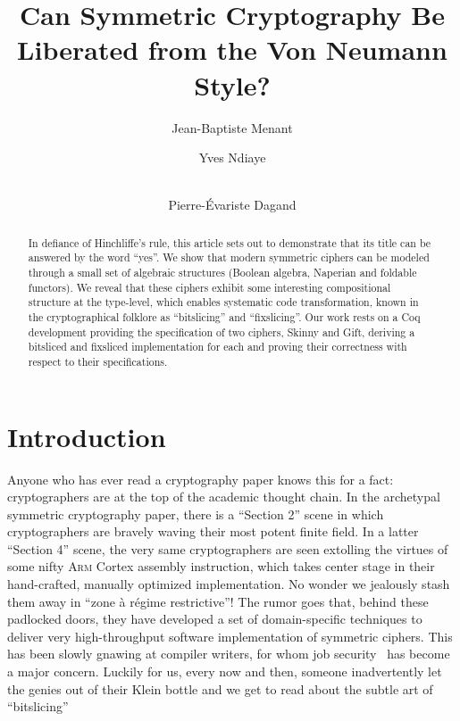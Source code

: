 \documentclass[draft,english]{jflart}
\title{Can Symmetric Cryptography Be Liberated from the Von Neumann
  Style?}
\author[1]{Jean-Baptiste Menant}
\author[2]{Yves Ndiaye}
\author[2,3]{\\Pierre-Évariste Dagand}
\affil[1]{École Normale Supérieure de Lyon}
\affil[2]{Université Paris Cité, IRIF}
\affil[3]{CNRS}
\begin{document}
\maketitle

\begin{abstract}

  In defiance of Hinchliffe's rule, this article sets out to
  demonstrate that its title can be answered by the word ``yes''. We
  show that modern symmetric ciphers can be modeled through a small
  set of algebraic structures (Boolean algebra, Naperian and foldable
  functors). We reveal that these ciphers exhibit some interesting
  compositional structure at the type-level, which enables systematic
  code transformation, known in the cryptographical folklore as
  ``bitslicing'' and ``fixslicing''. Our work rests on a Coq
  development providing the specification of two ciphers, Skinny and
  Gift, deriving a bitsliced and fixsliced implementation for each and
  proving their correctness with respect to their specifications.

\end{abstract}

\section{Introduction}


Anyone who has ever read a cryptography paper knows this for a fact:
cryptographers are at the top of the academic thought chain. In the
archetypal symmetric cryptography paper, there is a ``Section 2''
scene in which cryptographers are bravely waving their most potent
finite field. In a latter ``Section 4'' scene, the very same
cryptographers are seen extolling the virtues of some nifty
\textsc{Arm} Cortex assembly instruction, which takes center stage in
their hand-crafted, manually optimized implementation. No wonder we
jealously stash them away in ``zone à régime restrictive''! The rumor
goes that, behind these padlocked doors, they have developed a set of
domain-specific techniques to deliver very high-throughput software
implementation of symmetric ciphers. This has been slowly gnawing at
compiler writers, for whom job security~\citep{bernstein} has become a
major concern. Luckily for us, every now and then, someone
inadvertently let the genies out of their Klein bottle and we get to
read about the subtle art of ``bitslicing''~\citep{kwan:bitslicing}
\end{document}
